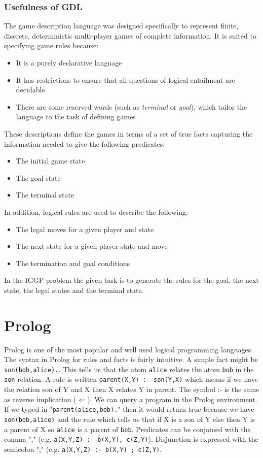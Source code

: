 \subsubsection{Usefulness of GDL}
The game description language was designed specifically to represent finite, discrete, deterministic multi-player games of complete information. It is suited to specifying game rules because:
\begin{itemize}
\item It is a purely declarative language
\item It has restrictions to ensure that all questions of logical entailment are decidable
\item There are some reserved words (such as \textit{terminal} or \textit{goal}), which tailor the language to the task of defining games
\end{itemize}
These descriptions define the games in terms of a set of true facts capturing the information needed to give the following predicates:
\begin{itemize}
\item The initial game state
\item The goal state
\item The terminal state
\end{itemize}
In addition, logical rules are used to describe the following:
\begin{itemize}
\item The legal moves for a given player and state
\item The next state for a given player state and move
\item The termination and goal conditions
\end{itemize}
In the IGGP problem the given task is to generate the rules for the goal, the next state, the legal states and the terminal state.

\section{Prolog}
Prolog is one of the most popular and well used logical programming languages. The syntax in Prolog for rules and facts is fairly intuitive. A simple fact might be \texttt{son(bob,alice).}. This tells us that the atom \texttt{alice} relates the atom \texttt{bob} in the \texttt{son} relation. A rule is written \texttt{parent(X,Y) :- son(Y,X)} which means if we have the relation son of Y and X then X relates Y in parent. The symbol :- is the same as reverse implication ($\Leftarrow$). We can query a program in the Prolog environment. If we typed in "\texttt{parent(alice,bob).}" then it would return true because we have \texttt{son(bob,alice)} and the rule which tells us that if X is a son of Y else then Y is a parent of X so \texttt{alice} is a parent of \texttt{bob}. Predicates can be conjoined with the comma "," (e.g. \texttt{a(X,Y,Z) :- b(X,Y), c(Z,Y)}). Disjunction is expressed with the semicolon ";" (e.g. \texttt{a(X,Y,Z) :- b(X,Y) ; c(Z,Y)}.

